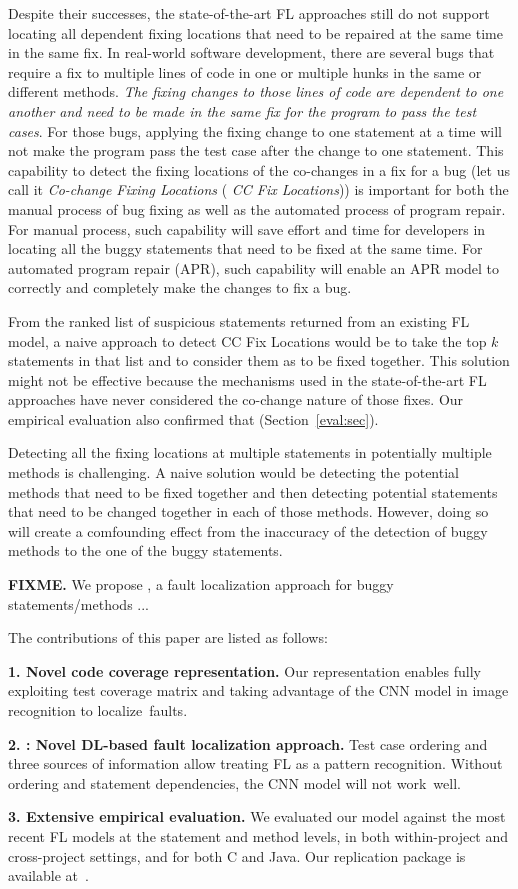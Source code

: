 Despite their successes, the state-of-the-art FL approaches still do
not support locating all dependent fixing locations that need to be repaired
at the same time in the same fix. In real-world software development,
there are several bugs that require a fix to multiple lines of code in
one or multiple hunks in the same or different methods. {\em The
  fixing changes to those lines of code are dependent to one another
  and need to be made in the same fix for the program to pass the test
  cases}. For those bugs, applying the fixing change to one statement
at a time will not make the program pass the test case after the
change to one statement.
%
This capability to detect the fixing locations of the co-changes in a
fix for a bug (let us call it {\em Co-change Fixing Locations} ({\em
  CC Fix Locations})) is important for both the manual process of bug
fixing as well as the automated process of program repair. For
manual process, such capability will save effort and time for
developers in locating all the buggy statements that need to be fixed
at the same time. For automated program repair (APR), such capability
will enable an APR model to correctly and completely make the changes
to fix a bug.

From the ranked list of suspicious statements returned from an
existing FL model, a naive approach to detect CC Fix Locations would
be to take the top $k$ statements in that list and to consider them as
to be fixed together. This solution might not be effective
because the mechanisms used in the state-of-the-art FL approaches have
never considered the co-change nature of those fixes. Our empirical
evaluation also confirmed that (Section~\ref{eval:sec}).

Detecting all the fixing locations at multiple statements in
potentially multiple methods is challenging. A naive solution would be
detecting the potential methods that need to be fixed together and
then detecting potential statements that need to be changed together
in each of those methods. However, doing so will create a comfounding
effect from the inaccuracy of the detection of buggy methods to the
one of the buggy statements.

{\bf FIXME.} We propose {\tool}, a fault localization approach for
buggy statements/methods ...

The contributions of this paper are listed as follows:

{\bf 1. Novel code coverage representation.} Our representation
enables fully exploiting test coverage matrix and taking advantage of
the CNN model in image recognition to localize~faults.

{\bf 2. {\tool}: Novel DL-based fault localization approach.} Test
case ordering and three sources of information allow treating FL as a
pattern recognition. Without ordering and statement dependencies, the
CNN model will not work~well.

{\bf 3. Extensive empirical evaluation.} We evaluated our model
against the most recent FL models at the statement and method levels,
in both within-project and cross-project settings, and for both C and
Java. Our replication package is available
at~\cite{FaultLocalization2021}.

